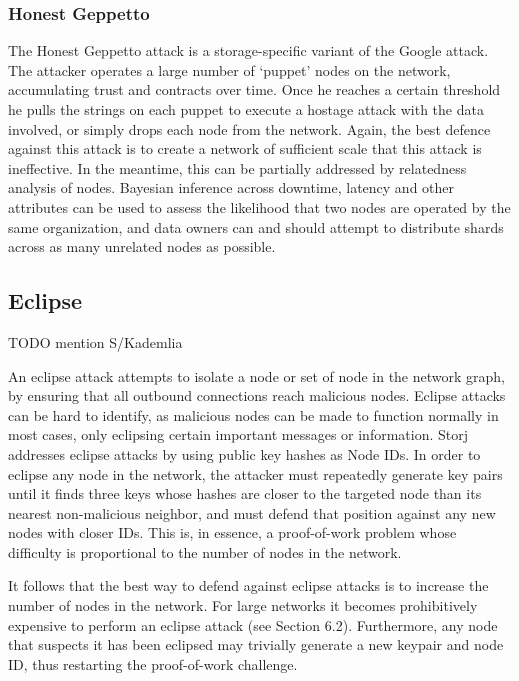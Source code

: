 \documentclass[a4paper,10pt]{article} \usepackage[utf8]{inputenc}
\newcommand{\todo}[1]{{\color{red} TODO #1}}
\begin{document}
\subsubsection{Honest Geppetto}

The Honest Geppetto attack is a storage-specific variant of the Google attack.
The attacker operates a large number of ‘puppet’ nodes on the network,
accumulating trust and contracts over time. Once he reaches a certain threshold
he pulls the strings on each puppet to execute a hostage attack with the data
involved, or simply drops each node from the network. Again, the best defence
against this attack is to create a network of sufficient scale that this attack
is ineffective. In the meantime, this can be partially addressed by relatedness
analysis of nodes. Bayesian inference across downtime, latency and other
attributes can be used to assess the likelihood that two nodes are operated by
the same organization, and data owners can and should attempt to distribute
shards across as many unrelated nodes as possible.

\subsection{Eclipse}

\todo{mention S/Kademlia

An eclipse attack attempts to isolate a node or set of node in the network
graph, by ensuring that all outbound connections reach malicious nodes. Eclipse
attacks can be hard to identify, as malicious nodes can be made to function
normally in most cases, only eclipsing certain important messages or
information. Storj addresses eclipse attacks by using public key hashes as Node
IDs. In order to eclipse any node in the network, the attacker must repeatedly
generate key pairs until it finds three keys whose hashes are closer to the
targeted node than its nearest non-malicious neighbor, and must defend that
position against any new nodes with closer IDs. This is, in essence, a
proof-of-work problem whose difficulty is proportional to the number of nodes in
the network.

It follows that the best way to defend against eclipse attacks is to increase
the number of nodes in the network. For large networks it becomes prohibitively
expensive to perform an eclipse attack (see Section 6.2). Furthermore, any node
that suspects it has been eclipsed may trivially generate a new keypair and node
ID, thus restarting the proof-of-work challenge. }
\end{document}
